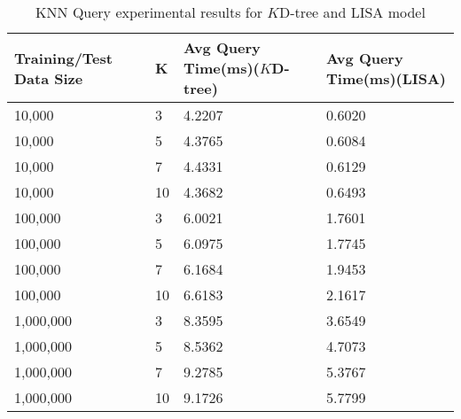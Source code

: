 \begin{table}
	\centering
\centering
	\begin{tabular}{||p{}<{\centering}|p{}<{\centering}|p{}<{\centering}|p{}<{\centering}||}
		\hline
		Training/Test Data Size& K & Avg Query Time(ms)($K$D-tree) & Avg Query Time(ms)(LISA)\\ [0.5ex] 
		\hline
		\hline
	 	10,000& 3& 4.2207 &0.6020 \\
	 	\hline
	 	10,000& 5& 4.3765 &0.6084\\
	 	\hline
	 	10,000& 7& 4.4331 &0.6129 \\
	 	\hline
	 	10,000 & 10&4.3682 &0.6493 \\
	 	\hline
	 	100,000 & 3& 6.0021 &1.7601 \\
	 	\hline
	 	100,000 & 5& 6.0975 &1.7745 \\
	 	\hline
	 	100,000 & 7& 6.1684 &1.9453 \\
	 	\hline
	 	100,000 & 10& 6.6183 &2.1617 \\
	 	\hline
	    1,000,000 & 3& 8.3595 & 3.6549 \\
	 	\hline
	 	1,000,000 & 5& 8.5362 &4.7073 \\
	 	\hline
	 	1,000,000 & 7& 9.2785 &5.3767 \\
	 	\hline
	 	1,000,000 & 10& 9.1726 &5.7799 \\
		\hline
		\hline
	\end{tabular}
	\caption{KNN Query experimental results for $K$D-tree and LISA model}
	\label{KNN_Query_Experimental_Results}

\end{table}



